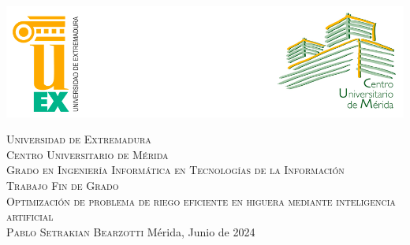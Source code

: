 \pagestyle{empty}



\begin{center}
	\newcommand{\HRule}{\rule{\linewidth}{0.7mm}}
	\begin{center}
            \includegraphics[width=\columnwidth, keepaspectratio]{images/logo.png}\\
        \end{center}

	\vspace*{2cm}
	\textsc{\large Universidad de Extremadura}\\[0.5cm]
	\textsc{\large Centro Universitario de Mérida}\\[1.3cm]
	\textsc{\LARGE Grado en Ingeniería Informática en Tecnologías de la Información}\\[1.3cm]
	\textsc{\huge Trabajo Fin de Grado}\\[2cm]
	\textsc{\LARGE Optimización de problema de riego eficiente en higuera mediante inteligencia artificial }\\[1.5 cm]
	
	\textsc{\large Pablo Setrakian Bearzotti}
	\vspace{2cm} 
	\vfill
	Mérida, Junio de 2024
\end{center}
